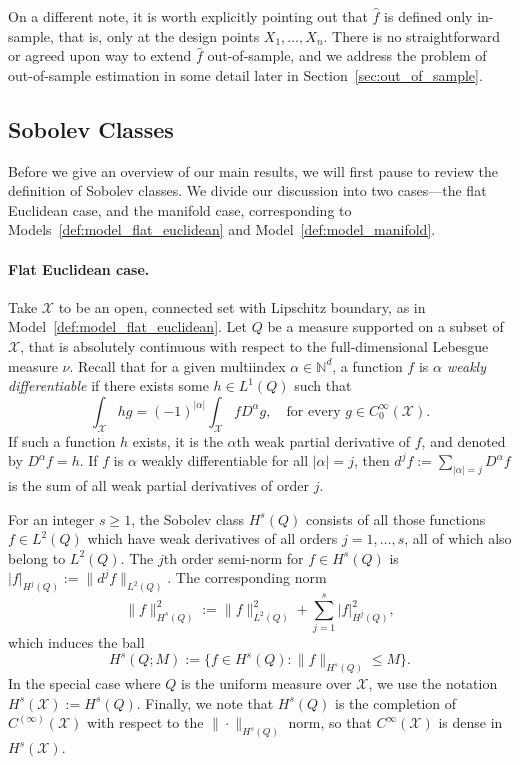 \documentclass{article}
\newcommand{\1}{\mathbf{1}}
\newcommand{\Leb}{L}
\newcommand{\mc}[1]{\mathcal{#1}}
\newcommand{\wh}[1]{\widehat{#1}}
\theoremstyle{alden}
\theoremstyle{aldenthm}
\theoremstyle{definition}
\theoremstyle{remark}
\begin{document}
On a different note, it is worth explicitly pointing out that $\wh{f}$ is defined only in-sample, that is, only at the design points $X_1,\ldots,X_n$. There is no straightforward or agreed upon way to extend $\wh{f}$ out-of-sample, and we address the problem of out-of-sample estimation in some detail later in Section~\ref{sec:out_of_sample}. 

\subsection{Sobolev Classes}
\label{sec:sobolev}
Before we give an overview of our main results, we will first pause to review the definition of Sobolev classes. We divide our discussion into two cases---the flat Euclidean case, and the manifold case, corresponding to Models~\ref{def:model_flat_euclidean} and Model~\ref{def:model_manifold}.

\paragraph{Flat Euclidean case.}
Take $\mc{X}$ to be an open, connected set with Lipschitz boundary, as in Model~\ref{def:model_flat_euclidean}. Let $Q$ be a measure supported on a subset of $\mc{X}$, that is absolutely continuous with respect to the full-dimensional Lebesgue measure $\nu$. Recall that for a given multiindex $\alpha \in \mathbb{N}^d$, a function $f$ is \emph{$\alpha$ weakly differentiable} if there exists some $h \in L^1(Q)$ such that
\begin{equation*}
\int_{\mc{X}} h g = (-1)^{|\alpha|} \int_{\mc{X}} f D^{\alpha}g, \quad \textrm{for every $g \in C_0^{\infty}(\mc{X})$.}
\end{equation*}
If such a function $h$ exists, it is the $\alpha$th weak partial derivative of $f$, and denoted by $D^{\alpha}f = h$. If $f$ is $\alpha$ weakly differentiable for all $|\alpha| = j$, then $d^jf := \sum_{|\alpha| = j}D^{\alpha}f$ is the sum of all weak partial derivatives of order $j$. 

For an integer $s \geq 1$, the Sobolev class $H^s(Q)$ consists of all those functions $f \in \Leb^2(Q)$ which have weak derivatives of all orders $j = 1,\ldots,s$, all of which also belong to $\Leb^2(Q)$. The $j$th order semi-norm for $f \in H^s(Q)$ is $|f|_{H^j(Q)} := \|d^jf\|_{L^2(Q)}$. The corresponding norm
\begin{equation*}
\|f\|_{H^s(Q)}^2 := \|f\|_{\Leb^2(Q)}^2 + \sum_{j = 1}^{s} |f|_{H^j(Q)}^2,
\end{equation*}
which induces the ball
\begin{equation*}
H^s(Q;M) := \bigl\{f \in H^s(Q): \|f\|_{H^s(Q)} \leq M\bigr\}.
\end{equation*} 
In the special case where $Q$ is the uniform measure over $\mc{X}$, we use the notation $H^s(\mc{X}) := H^s(Q)$. Finally, we note that $H^s(Q)$ is the completion of $C^{(\infty)}(\mc{X})$ with respect to the $\|\cdot\|_{H^s(Q)}$ norm, so that $C^{\infty}(\mc{X})$ is dense in $H^s(\mc{X})$. 
\end{document}

